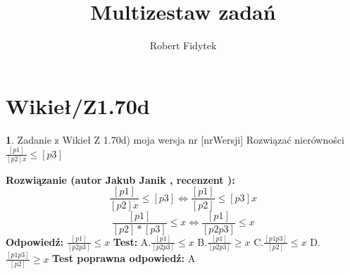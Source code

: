 \documentclass[12pt, a4paper]{article}
\title{Multizestaw zadań}
\author{Robert Fidytek}
\date{}
\theoremstyle{definition} %
\newtheorem{zad}{}
\newcommand{\kategoria}[1]{\section{#1}} %
\newcommand{\zadStart}[1]{\begin{zad}#1\newline} %
\newcommand{\zadStop}{\end{zad}}   %
\newcommand{\rozwStart}[2]{\noindent \textbf{Rozwiązanie (autor #1 , recenzent #2): }\newline} %
\newcommand{\rozwStop}{\newline}                                            %
\newcommand{\odpStart}{\noindent \textbf{Odpowiedź:}\newline}    %
\newcommand{\odpStop}{\newline}                                             %
\newcommand{\testStart}{\noindent \textbf{Test:}\newline} %
\newcommand{\testStop}{\newline} %
\newcommand{\kluczStart}{\noindent \textbf{Test poprawna odpowiedź:}\newline} %
\newcommand{\kluczStop}{\newline} %
\begin{document}
\maketitle


\kategoria{Wikieł/Z1.70d}
\zadStart{Zadanie z Wikieł Z 1.70d) moja wersja nr [nrWersji]}
Rozwiązać nierówności $\frac{[p1]}{[p2]x} \leq [p3]$
\zadStop
\rozwStart{Jakub Janik}{}
$$\frac{[p1]}{[p2]x} \leq [p3] \Leftrightarrow \frac{[p1]}{[p2]} \leq [p3]x$$
$$\frac{[p1]}{[p2]*[p3]} \leq x \Leftrightarrow \frac{[p1]}{[p2p3]} \leq x$$
\rozwStop
\odpStart
$\frac{[p1]}{[p2p3]} \leq x$
\odpStop
\testStart
A.$\frac{[p1]}{[p2p3]} \leq x$
B.$\frac{[p1]}{[p2p3]} \geq x$
C.$\frac{[p1p3]}{[p2]} \leq x$
D.$\frac{[p1p3]}{[p2]} \geq x$
\testStop
\kluczStart
A
\kluczStop
\end{document}
